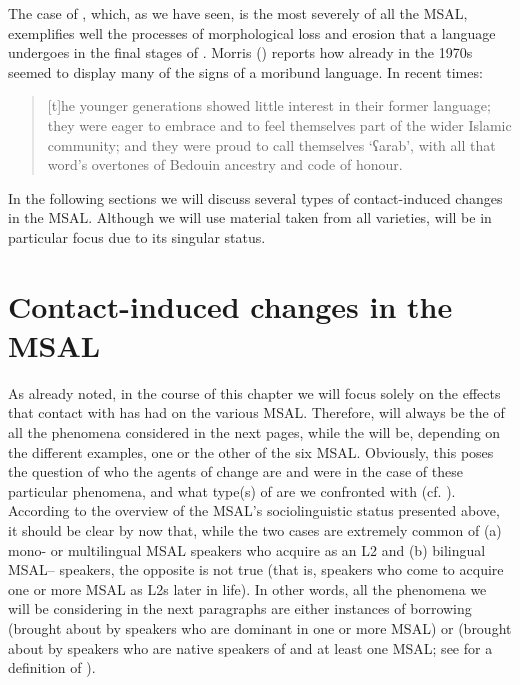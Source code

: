 \documentclass[output=paper]{langsci/langscibook}
\begin{document}
The case of , which, as we have seen, is the most severely  of all the MSAL, exemplifies well the processes of morphological loss and erosion that a language undergoes in the final stages of . Morris (\citeyear{Morris2017}) reports how already in the 1970s  seemed to display many of the signs of a moribund language. In recent times:

\begin{quote}
[t]he younger generations showed little interest in their former language; they were eager to embrace  and to feel themselves part of the wider  Islamic community; and they were proud to call themselves ‘ʕarab’, with all that word’s overtones of Bedouin ancestry and code of honour. \citep[11]{Morris2017}
\end{quote}

In the following sections we will discuss several types of contact-induced changes in the MSAL. Although we will use material taken from all varieties,  will be in particular focus due to its singular status.

\section{Contact-induced changes in the MSAL}\label{sec:3}

As already noted, in the course of this chapter we will focus solely on the effects that contact with  has had on the various MSAL. Therefore,  will always be the  of all the  phenomena considered in the next pages, while the  will be, depending on the different examples, one or the other of the six MSAL. Obviously, this poses the question of who the agents of change are and were in the case of these particular phenomena, and what type(s) of  are we confronted with (cf. \citealt{VanCoetsem1988,VanCoetsem2000,Winford2005}). According to the overview of the MSAL’s sociolinguistic status presented above, it should be clear by now that, while the two cases are extremely common of (a) mono- or multilingual MSAL speakers who acquire  as an L2 and (b) bilingual MSAL-- speakers, the opposite is not true (that is,   speakers who come to acquire one or more MSAL as L2s later in life). In other words, all the  phenomena we will be considering in the next paragraphs are either instances of borrowing (brought about by speakers who are dominant in one or more MSAL) or  (brought about by speakers who are native speakers of  and at least one MSAL; see \citealt{Lucas2015} for a definition of ). 
\end{document}
